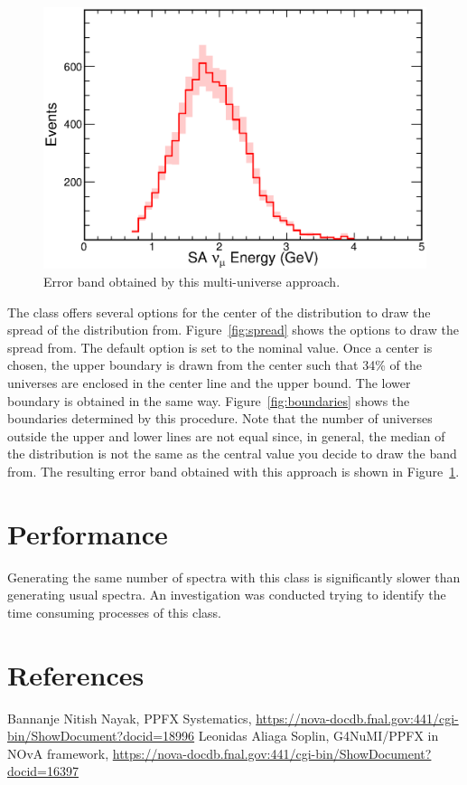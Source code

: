 \documentclass[12pt,a4paper,final]{iopart}
\begin{document}
\begin{figure}[h]
  \centering
  \includegraphics[width=.75\textwidth]{figures/reco_nue_w_error.eps}
  \caption{Error band obtained by this multi-universe approach.}
  \label{fig:reco_nue_w_error}
\end{figure}

The class offers several options for the center of the distribution to draw the spread of the distribution from. Figure~\ref{fig:spread} shows the options to draw the spread from. The default option is set to the nominal value. Once a center is chosen, the upper boundary is drawn from the center such that 34\% of the universes are enclosed in the center line and the upper bound. The lower boundary is obtained in the same way. Figure~\ref{fig:boundaries} shows the boundaries determined by this procedure. Note that the number of universes outside the upper and lower lines are not equal since, in general, the median of the distribution is not the same as the central value you decide to draw the band from. The resulting error band obtained with this approach is shown in Figure~\ref{fig:reco_nue_w_error}.

\section{Performance}
Generating the same number of spectra with this class is significantly slower than generating usual spectra. An investigation was conducted trying to identify the time consuming processes of this class.

\section*{References}
\begin{thebibliography}{10}
   Bannanje Nitish Nayak, PPFX Systematics, \url{https://nova-docdb.fnal.gov:441/cgi-bin/ShowDocument?docid=18996}
   Leonidas Aliaga Soplin, G4NuMI/PPFX in NOvA framework, \url{https://nova-docdb.fnal.gov:441/cgi-bin/ShowDocument?docid=16397}
\end{thebibliography}
  
\end{document}

